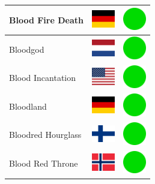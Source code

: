 \documentclass[12pt, a4paper, twoside]{report}
\begin{document}
\begin{center}
\begin{longtable}{|p{5cm}|p{2cm}|p{2cm}|}
 Blood Fire Death                                           & \includegraphics[width=1cm]{../4x3/de} &   \includegraphics[width=1cm]{../likes/y} \\ \hline
 Bloodgod                                                   & \includegraphics[width=1cm]{../4x3/nl} &   \includegraphics[width=1cm]{../likes/y} \\ \hline
 Blood Incantation                                          & \includegraphics[width=1cm]{../4x3/us} &   \includegraphics[width=1cm]{../likes/y} \\ \hline
 Bloodland                                                  & \includegraphics[width=1cm]{../4x3/de} &   \includegraphics[width=1cm]{../likes/y} \\ \hline
 Bloodred Hourglass                                         & \includegraphics[width=1cm]{../4x3/fi} &   \includegraphics[width=1cm]{../likes/y} \\ \hline
 Blood Red Throne                                           & \includegraphics[width=1cm]{../4x3/no} &   \includegraphics[width=1cm]{../likes/y} \\ \hline

\end{longtable}
\end{center}
\end{document}
